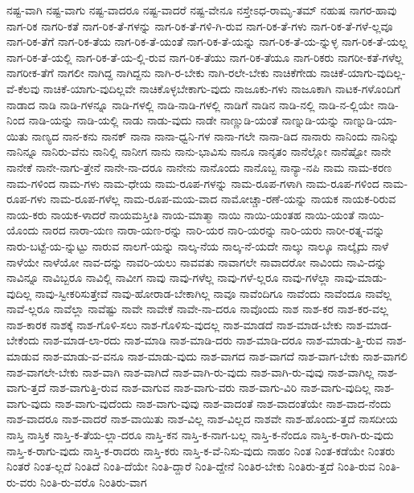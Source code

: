 {ನಷ್ಟ-ವಾಗಿ
ನಷ್ಟ-ವಾಗು
ನಷ್ಟ-ವಾದರೂ
ನಷ್ಟ-ವಾದರೆ
ನಷ್ಟ-ವೇನೂ
ನಸ್ತೇಽಧ-ರಾಮೃ-ತಮ್
ನಹುಷ
ನಾಗರ-ಹಾವು
ನಾಗ-ರಿಕ
ನಾಗರಿ-ಕತೆ
ನಾಗ-ರಿಕ-ತೆ-ಗಳನ್ನು
ನಾಗ-ರಿಕ-ತೆ-ಗಳಿ-ಗಿ-ರುವ
ನಾಗ-ರಿಕ-ತೆ-ಗಳು
ನಾಗ-ರಿಕ-ತೆ-ಗಳೆ-ಲ್ಲವೂ
ನಾಗ-ರಿಕ-ತೆಗೆ
ನಾಗ-ರಿಕ-ತೆಯ
ನಾಗ-ರಿಕ-ತೆ-ಯಂತೆ
ನಾಗ-ರಿಕ-ತೆ-ಯನ್ನು
ನಾಗ-ರಿಕ-ತೆ-ಯ-ನ್ನುಳ್ಳ
ನಾಗ-ರಿಕ-ತೆ-ಯಲ್ಲ
ನಾಗ-ರಿಕ-ತೆ-ಯಲ್ಲಿ
ನಾಗ-ರಿಕ-ತೆ-ಯ-ಲ್ಲಿ-ರುವ
ನಾಗ-ರಿಕ-ತೆಯು
ನಾಗ-ರಿಕ-ತೆಯೂ
ನಾಗ-ರಿಕರು
ನಾಗರೀ-ಕತೆ-ಗಳೆಲ್ಲ
ನಾಗರೀಕ-ತೆಗೆ
ನಾಗಲೀ
ನಾಗಿದ್ದ
ನಾಗಿದ್ದನು
ನಾಗಿ-ರ-ಬೇಕು
ನಾಗಿ-ರಲೇ-ಬೇಕು
ನಾಚಿಕೆಗೇಡು
ನಾಚಿಕೆ-ಯಾಗು-ವುದಿಲ್ಲ-ವೆ-ಕೆಲವು
ನಾಚಿಕೆ-ಯಾಗು-ವುದಿಲ್ಲವೇ
ನಾಚಿಕೊಳ್ಳಬೇಕಾಗು-ವುದು
ನಾಜೂಕು-ಗಳು
ನಾಜೂಕಾಗಿ
ನಾಟಕ-ಗಳೊಂದಿಗೆ
ನಾಡಾದ
ನಾಡಿ
ನಾಡಿ-ಗಳನ್ನೂ
ನಾಡಿ-ಗಳಲ್ಲಿ
ನಾಡಿ-ನಾಡಿ-ಗಳಲ್ಲಿ
ನಾಡಿಗೆ
ನಾಡಿನ
ನಾಡಿ-ನಲ್ಲಿ
ನಾಡಿ-ನ-ಲ್ಲಿಯೇ
ನಾಡಿ-ನಿಂದ
ನಾಡಿ-ಯನ್ನು
ನಾಡಿ-ಯಲ್ಲಿ
ನಾಡು
ನಾಡು-ವುದು
ನಾಡೇ
ನಾಣ್ಣುಡಿ-ಯಂತೆ
ನಾಣ್ನುಡಿ-ಯನ್ನು
ನಾಣ್ನುಡಿ-ಯಾ-ಯಿತು
ನಾಣ್ಯದ
ನಾನ-ಕನು
ನಾನಕ್
ನಾನಾ
ನಾನಾ-ಧ್ವನಿ-ಗಳ
ನಾನಾ-ಗಲೇ
ನಾನಾ-ಡಿದ
ನಾನಾರು
ನಾನಿಂದು
ನಾನಿನ್ನು
ನಾನಿನ್ನೂ
ನಾನಿರು-ವೆನು
ನಾನಿಲ್ಲಿ
ನಾನೀಗ
ನಾನು
ನಾನು-ಭಾವಿಸು
ನಾನೂ
ನಾನೃತಂ
ನಾನೆಲ್ಲೋ
ನಾನೆಷ್ಟೋ
ನಾನೇ
ನಾನೇಕೆ
ನಾನೇ-ನಾಗು-ತ್ತೇನೆ
ನಾನೇ-ನಾ-ದರೂ
ನಾನೇನು
ನಾನೊಂದು
ನಾನೊಬ್ಬ
ನಾನ್ಯಾ-ನಪಿ
ನಾಮ
ನಾಮ-ಕರಣ
ನಾಮ-ಗಳಿಂದ
ನಾಮ-ಗಳು
ನಾಮ-ಧೇಯ
ನಾಮ-ರೂಪ-ಗಳನ್ನು
ನಾಮ-ರೂಪ-ಗಳಾಗಿ
ನಾಮ-ರೂಪ-ಗಳಿಂದ
ನಾಮ-ರೂಪ-ಗಳು
ನಾಮ-ರೂಪ-ಗಳೆಲ್ಲ
ನಾಮ-ರೂಪ-ಮಯ-ವಾದ
ನಾಮೋಚ್ಚಾ-ರಣೆ-ಯನ್ನು
ನಾಯಕ
ನಾಯಕ-ರಿರುವ
ನಾಯ-ಕರು
ನಾಯಕ-ಳಾದರೆ
ನಾಯಮಸ್ತೀತಿ
ನಾಯ-ಮಾತ್ಮಾ
ನಾಯಿ
ನಾಯಿ-ಯಂತಹ
ನಾಯಿ-ಯಂತೆ
ನಾಯಿ-ಯೊಂದು
ನಾರದ
ನಾರಾ-ಯಣ
ನಾರಾ-ಯಣ-ರನ್ನು
ನಾರಿ-ಯರ
ನಾರಿ-ಯರನ್ನು
ನಾರಿ-ಯರು
ನಾರೀ-ರತ್ನ-ವನ್ನು
ನಾರು-ಬಟ್ಟೆ-ಯ-ನ್ನುಟ್ಟು
ನಾರುವ
ನಾಲಗೆ-ಯನ್ನು
ನಾಲ್ಕ-ನೆಯ
ನಾಲ್ಕ-ನೆ-ಯದೇ
ನಾಲ್ಕು
ನಾಲ್ಕೂ
ನಾಲ್ಕೈದು
ನಾಳೆ
ನಾಳೆಯೇ
ನಾಳೆಯೋ
ನಾವ-ದನ್ನು
ನಾವರಿ-ಯಲು
ನಾವವತು
ನಾವಾಗಲೇ
ನಾವಾದರೋ
ನಾವಿಂದು
ನಾವಿ-ದನ್ನು
ನಾವಿನ್ನೂ
ನಾವಿಬ್ಬರೂ
ನಾವಿಲ್ಲಿ
ನಾವೀಗ
ನಾವು
ನಾವು-ಗಳೆಲ್ಲ
ನಾವು-ಗಳೆ-ಲ್ಲರೂ
ನಾವು-ಗಳೆಲ್ಲಾ
ನಾವು-ಮಾಡು-ವುದಿಲ್ಲ
ನಾವು-ಸ್ವೀಕರಿಸುತ್ತೇವೆ
ನಾವು-ಹೋರಾಡ-ಬೇಕಾಗಿಲ್ಲ
ನಾವೂ
ನಾವೆಂದಿಗೂ
ನಾವೆಂದು
ನಾವೆಂದೂ
ನಾವೆಲ್ಲ
ನಾವೆ-ಲ್ಲರೂ
ನಾವೆಲ್ಲಾ
ನಾವೆಷ್ಟು
ನಾವೇ
ನಾವೇಕೆ
ನಾವೇ-ನಾ-ದರೂ
ನಾವೊಂದು
ನಾಶ
ನಾಶ-ಕರ
ನಾಶ-ಕರ-ವಲ್ಲ
ನಾಶ-ಕಾರಕ
ನಾಶಕ್ಕೆ
ನಾಶ-ಗೊಳಿ-ಸಲು
ನಾಶ-ಗೊಳಿಸು-ವುದಲ್ಲ
ನಾಶ-ಮಾಡದೆ
ನಾಶ-ಮಾಡ-ಬೇಕು
ನಾಶ-ಮಾಡ-ಬೇಕೆಂದು
ನಾಶ-ಮಾಡ-ಲಾ-ರದು
ನಾಶ-ಮಾಡಿ
ನಾಶ-ಮಾಡಿ-ದರು
ನಾಶ-ಮಾಡಿ-ದರೂ
ನಾಶ-ಮಾಡು-ತ್ತಿ-ರುವ
ನಾಶ-ಮಾಡುವ
ನಾಶ-ಮಾಡು-ವ-ವನೂ
ನಾಶ-ಮಾಡು-ವುದು
ನಾಶ-ವಾಗದ
ನಾಶ-ವಾಗದೆ
ನಾಶ-ವಾಗ-ಬೇಕು
ನಾಶ-ವಾಗಲಿ
ನಾಶ-ವಾಗಲೇ-ಬೇಕು
ನಾಶ-ವಾಗಿ
ನಾಶ-ವಾಗಿದೆ
ನಾಶ-ವಾಗಿ-ರು-ವುದು
ನಾಶ-ವಾಗಿ-ರು-ವುವು
ನಾಶ-ವಾಗಿಲ್ಲ
ನಾಶ-ವಾಗು-ತ್ತದೆ
ನಾಶ-ವಾಗುತ್ತಿ-ರುವ
ನಾಶ-ವಾಗುವ
ನಾಶ-ವಾಗು-ವರು
ನಾಶ-ವಾಗು-ವಿರಿ
ನಾಶ-ವಾಗು-ವುದಿಲ್ಲ
ನಾಶ-ವಾಗು-ವುದು
ನಾಶ-ವಾಗು-ವುದೆಂದು
ನಾಶ-ವಾಗು-ವುವು
ನಾಶ-ವಾದಂತೆ
ನಾಶ-ವಾದಂತೆಯೇ
ನಾಶ-ವಾದ-ನೆಂದು
ನಾಶ-ವಾದರೂ
ನಾಶ-ವಾದರೆ
ನಾಶ-ವಾಯಿತು
ನಾಶ-ವಿಲ್ಲ
ನಾಶ-ವಿಲ್ಲದ
ನಾಶವೇ
ನಾಶ-ಹೊಂದು-ತ್ತದೆ
ನಾಸದೀಯ
ನಾಸ್ತಿ
ನಾಸ್ತಿಕ
ನಾಸ್ತಿ-ಕ-ತೆಯ-ಲ್ಲಾ-ದರೂ
ನಾಸ್ತಿ-ಕನ
ನಾಸ್ತಿ-ಕ-ನಾಗ-ಬಲ್ಲ
ನಾಸ್ತಿ-ಕ-ನೆಂದೂ
ನಾಸ್ತಿ-ಕ-ರಾಗಿ-ರು-ವುದು
ನಾಸ್ತಿ-ಕ-ರಾಗು-ವುದು
ನಾಸ್ತಿ-ಕ-ರಾದರು
ನಾಸ್ತಿ-ಕರು
ನಾಸ್ತಿ-ಕ-ವೆ-ನಿಸು-ವುದು
ನಾಹಂ
ನಿಂತ
ನಿಂತ-ಕಡೆಯೇ
ನಿಂತರು
ನಿಂತರೆ
ನಿಂತ-ಲ್ಲದೆ
ನಿಂತಿದೆ
ನಿಂತಿ-ದೆಯೇ
ನಿಂತಿ-ದ್ದಾರೆ
ನಿಂತಿ-ದ್ದೇನೆ
ನಿಂತಿರ-ಬೇಕು
ನಿಂತಿರು-ತ್ತದೆ
ನಿಂತಿ-ರುವ
ನಿಂತಿ-ರು-ವರು
ನಿಂತಿ-ರು-ವರೊ
ನಿಂತಿರು-ವಾಗ
}
